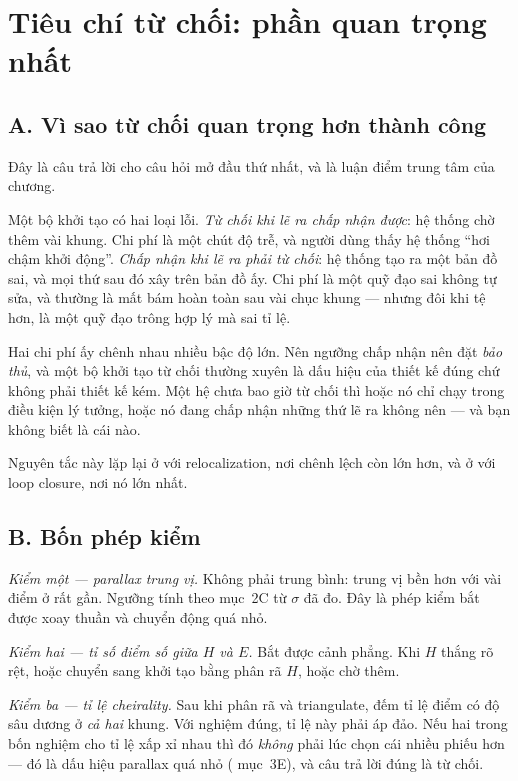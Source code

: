 \documentclass[../../vslam.tex]{subfiles}
\begin{document}
\section{Tiêu chí từ chối: phần quan trọng nhất}

\subsection{A. Vì sao từ chối quan trọng hơn thành công}

Đây là câu trả lời cho câu hỏi mở đầu thứ nhất, và là luận điểm trung tâm của chương.

Một bộ khởi tạo có hai loại lỗi. \emph{Từ chối khi lẽ ra chấp nhận được}: hệ thống chờ thêm vài khung. Chi phí là một chút độ trễ, và người dùng thấy hệ thống ``hơi chậm khởi động''. \emph{Chấp nhận khi lẽ ra phải từ chối}: hệ thống tạo ra một bản đồ sai, và mọi thứ sau đó xây trên bản đồ ấy. Chi phí là một quỹ đạo sai không tự sửa, và thường là mất bám hoàn toàn sau vài chục khung --- nhưng đôi khi tệ hơn, là một quỹ đạo trông hợp lý mà sai tỉ lệ.

Hai chi phí ấy chênh nhau nhiều bậc độ lớn. Nên ngưỡng chấp nhận nên đặt \emph{bảo thủ}, và một bộ khởi tạo từ chối thường xuyên là dấu hiệu của thiết kế đúng chứ không phải thiết kế kém. Một hệ chưa bao giờ từ chối thì hoặc nó chỉ chạy trong điều kiện lý tưởng, hoặc nó đang chấp nhận những thứ lẽ ra không nên --- và bạn không biết là cái nào.

Nguyên tắc này lặp lại ở  với relocalization, nơi chênh lệch còn lớn hơn, và ở  với loop closure, nơi nó lớn nhất.

\subsection{B. Bốn phép kiểm}

\emph{Kiểm một --- parallax trung vị.} Không phải trung bình: trung vị bền hơn với vài điểm ở rất gần. Ngưỡng tính theo mục~2C từ \(\sigma\) đã đo. Đây là phép kiểm bắt được xoay thuần và chuyển động quá nhỏ.

\emph{Kiểm hai --- tỉ số điểm số giữa \(H\) và \(E\).} Bắt được cảnh phẳng. Khi \(H\) thắng rõ rệt, hoặc chuyển sang khởi tạo bằng phân rã \(H\), hoặc chờ thêm.

\emph{Kiểm ba --- tỉ lệ cheirality.} Sau khi phân rã và triangulate, đếm tỉ lệ điểm có độ sâu dương ở \emph{cả hai} khung. Với nghiệm đúng, tỉ lệ này phải áp đảo. Nếu hai trong bốn nghiệm cho tỉ lệ xấp xỉ nhau thì đó \emph{không} phải lúc chọn cái nhiều phiếu hơn --- đó là dấu hiệu parallax quá nhỏ ( mục~3E), và câu trả lời đúng là từ chối.
\end{document}
